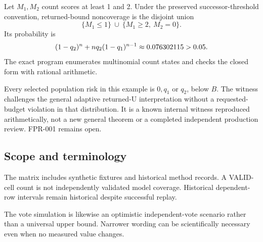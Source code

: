 Let \(M_1,M_2\) count scores at least 1 and 2. Under the preserved
successor-threshold convention, returned-bound noncoverage is the disjoint union
\begin{equation}
\{M_1\leq1\}\ \cup\ \{M_1\geq2,\ M_2=0\}.
\end{equation}
Its probability is
\begin{equation}
(1-q_2)^n+nq_2(1-q_1)^{n-1}
\approx 0.076302115 > 0.05.
\end{equation}
The exact program enumerates \WitnessStates{} multinomial count states and
checks the closed form with rational arithmetic.

Every selected population risk in this example is \(0,q_1\) or \(q_2\), below
\(B\). The witness challenges the general adaptive returned-U interpretation
without a requested-budget violation in that distribution. It is a known
internal witness reproduced arithmetically, not a new general theorem or a
completed independent production review. FPR-001 remains open.

\subsection{Scope and terminology}
The matrix includes synthetic fixtures and historical method records. A
VALID-cell count is not independently validated model coverage. Historical
dependent-row intervals remain historical despite successful replay.

The vote simulation is likewise an optimistic independent-vote scenario rather
than a universal upper bound. Narrower wording can be scientifically necessary
even when no measured value changes.

